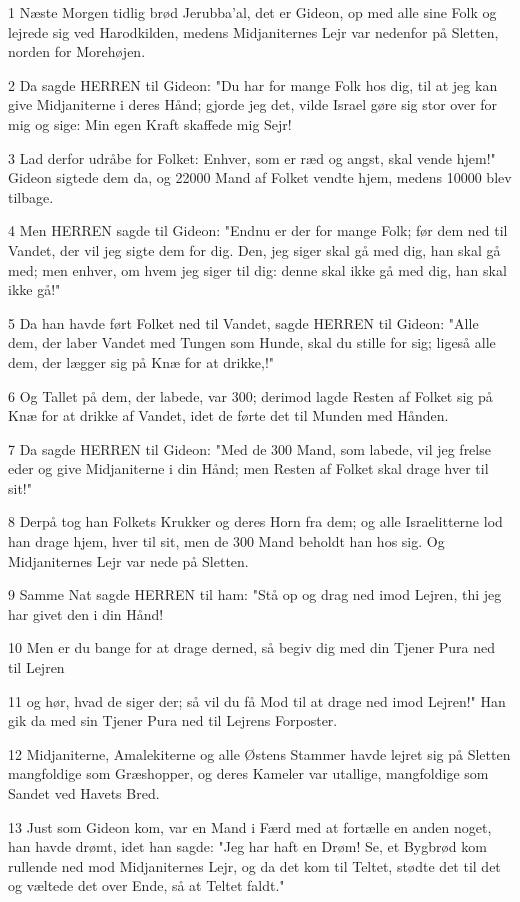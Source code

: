 \par 1 Næste Morgen tidlig brød Jerubba'al, det er Gideon, op med alle sine Folk og lejrede sig ved Harodkilden, medens Midjaniternes Lejr var nedenfor på Sletten, norden for Morehøjen.
\par 2 Da sagde HERREN til Gideon: "Du har for mange Folk hos dig, til at jeg kan give Midjaniterne i deres Hånd; gjorde jeg det, vilde Israel gøre sig stor over for mig og sige: Min egen Kraft skaffede mig Sejr!
\par 3 Lad derfor udråbe for Folket: Enhver, som er ræd og angst, skal vende hjem!" Gideon sigtede dem da, og 22000 Mand af Folket vendte hjem, medens 10000 blev tilbage.
\par 4 Men HERREN sagde til Gideon: "Endnu er der for mange Folk; før dem ned til Vandet, der vil jeg sigte dem for dig. Den, jeg siger skal gå med dig, han skal gå med; men enhver, om hvem jeg siger til dig: denne skal ikke gå med dig, han skal ikke gå!"
\par 5 Da han havde ført Folket ned til Vandet, sagde HERREN til Gideon: "Alle dem, der laber Vandet med Tungen som Hunde, skal du stille for sig; ligeså alle dem, der lægger sig på Knæ for at drikke,!"
\par 6 Og Tallet på dem, der labede, var 300; derimod lagde Resten af Folket sig på Knæ for at drikke af Vandet, idet de førte det til Munden med Hånden.
\par 7 Da sagde HERREN til Gideon: "Med de 300 Mand, som labede, vil jeg frelse eder og give Midjaniterne i din Hånd; men Resten af Folket skal drage hver til sit!"
\par 8 Derpå tog han Folkets Krukker og deres Horn fra dem; og alle Israelitterne lod han drage hjem, hver til sit, men de 300 Mand beholdt han hos sig. Og Midjaniternes Lejr var nede på Sletten.
\par 9 Samme Nat sagde HERREN til ham: "Stå op og drag ned imod Lejren, thi jeg har givet den i din Hånd!
\par 10 Men er du bange for at drage derned, så begiv dig med din Tjener Pura ned til Lejren
\par 11 og hør, hvad de siger der; så vil du få Mod til at drage ned imod Lejren!" Han gik da med sin Tjener Pura ned til Lejrens Forposter.
\par 12 Midjaniterne, Amalekiterne og alle Østens Stammer havde lejret sig på Sletten mangfoldige som Græshopper, og deres Kameler var utallige, mangfoldige som Sandet ved Havets Bred.
\par 13 Just som Gideon kom, var en Mand i Færd med at fortælle en anden noget, han havde drømt, idet han sagde: "Jeg har haft en Drøm! Se, et Bygbrød kom rullende ned mod Midjaniternes Lejr, og da det kom til Teltet, stødte det til det og væltede det over Ende, så at Teltet faldt."

